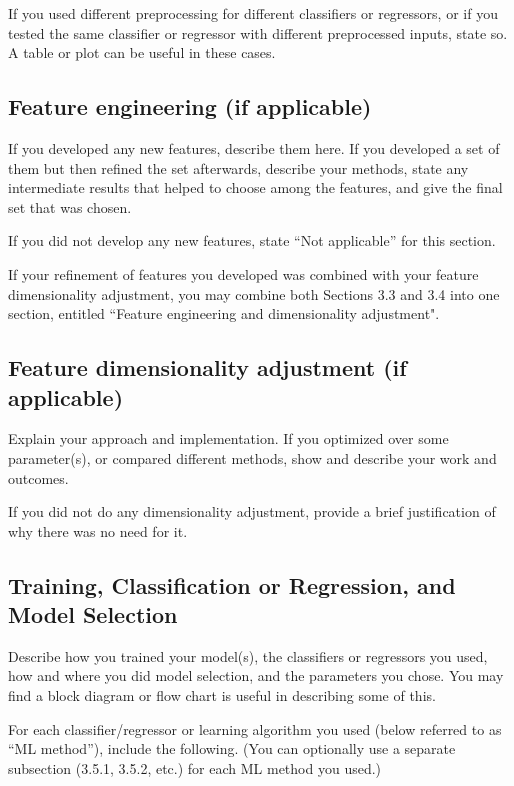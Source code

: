 \documentclass[singlecolumn]{article}
\begin{document}
If you used different preprocessing for different classifiers or regressors, or if you tested the same classifier or regressor with different preprocessed inputs, state so. A table or plot can be useful in these cases.

\subsection{Feature engineering (if applicable)}
If you developed any new features, describe them here.  If you developed a set of them but then refined the set afterwards, describe your methods, state any intermediate results that helped to choose among the features, and give the final set that was chosen. 
  
If you did not develop any new features, state “Not applicable” for this section.

If your refinement of features you developed was combined with your feature dimensionality adjustment, you may combine both Sections 3.3 and 3.4 into one section, entitled ``Feature engineering and dimensionality adjustment".

\subsection{Feature dimensionality adjustment (if applicable)}
Explain your approach and implementation. If you optimized over some parameter(s), or compared different methods, show and describe your work and outcomes.

If you did not do any dimensionality adjustment, provide a brief justification of why there was no need for it.

\subsection{Training, Classification or Regression, and Model Selection}
Describe how you trained your model(s), the classifiers or regressors you used, how and where you did model selection, and the parameters you chose.  You may find a block diagram or flow chart is useful in describing some of this.

For each classifier/regressor or learning algorithm you used (below referred to as “ML method”), include the following.  (You can optionally use a separate subsection (3.5.1, 3.5.2, etc.) for each ML method you used.)  
\end{document}
